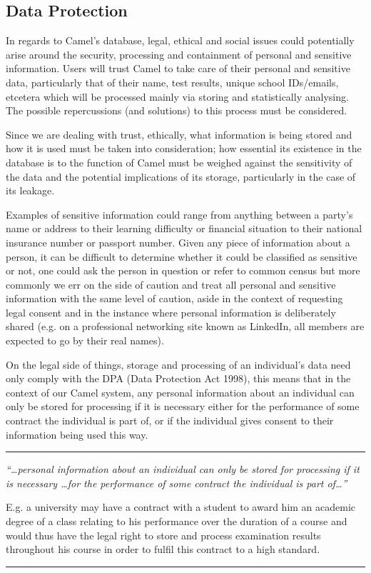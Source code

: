     \subsection*{Data Protection}
    In regards to Camel’s database, legal, ethical and social issues could potentially arise around the security, processing and containment of personal and sensitive information. Users will trust Camel to take care of their personal and sensitive data, particularly that of their name, test results, unique school IDs/emails, etcetera which will be processed mainly via storing and statistically analysing. The possible repercussions (and solutions) to this process must be considered.

    Since we are dealing with trust, ethically, what information is being stored and how it is used must be taken into consideration; how essential its existence in the database is to the function of Camel must be weighed against the sensitivity of the data and the potential implications of its storage, particularly in the case of its leakage.

    Examples of sensitive information could range from anything between a party’s name or address to their learning difficulty or financial situation to their national insurance number or passport number. Given any piece of information about a person, it can be difficult to determine whether it could be classified as sensitive or not, one could ask the person in question or refer to common census but more commonly we err on the side of caution and treat all personal and sensitive information with the same level of caution, aside in the context of requesting legal consent and in the instance where personal information is deliberately shared (e.g. on a professional networking site known as LinkedIn, all members are expected to go by their real names).
    
    On the legal side of things, storage and processing of an individual’s data need only comply with the DPA (Data Protection Act 1998), this means that in the context of our Camel system, any personal information about an individual can only be stored for processing if it is necessary either for the performance of some contract the individual is part of, or if the individual gives consent to their information being used this way.\cite{DPA:tDPP:S1}\cite{DPA:tDPP:S2}
    
    \vspace{0.2cm}
    \hrule
    \begin{center}
        \small \em “\ldots personal information about an individual can only be stored for processing if it is necessary \ldots for the performance of some contract the individual is part of…”
    \end{center}
    \begin{flushright}
        \scriptsize E.g. a university may have a contract with a student to award him an academic degree of a class relating to his performance over the duration of a course and would thus have the legal right to store and process examination results throughout his course in order to fulfil this contract to a high standard.
    \end{flushright}
    \hrule
    \vspace{0.2cm}

